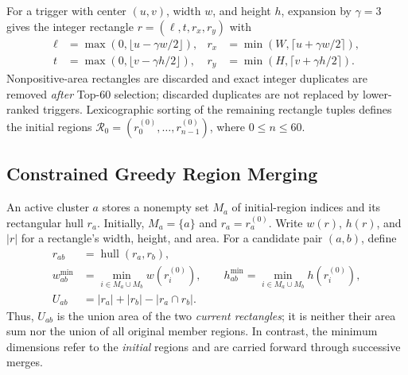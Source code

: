 \documentclass[journal]{IEEEtran}
\begin{document}
For a trigger with center $(u,v)$, width $w$, and height $h$, expansion by $\gamma=3$ gives the integer rectangle $r=(\ell,t,r_x,r_y)$ with
\begin{equation}
\begin{aligned}
\ell&=\max(0,\lfloor u-\gamma w/2\rfloor),&
r_x&=\min(W,\lceil u+\gamma w/2\rceil),\\
t&=\max(0,\lfloor v-\gamma h/2\rfloor),&
r_y&=\min(H,\lceil v+\gamma h/2\rceil).
\end{aligned}
\label{eq:expansion}
\end{equation}
Nonpositive-area rectangles are discarded and exact integer duplicates are removed \emph{after} Top-60 selection; discarded duplicates are not replaced by lower-ranked triggers. Lexicographic sorting of the remaining rectangle tuples defines the initial regions $\mathcal R_0=(r_0^{(0)},\ldots,r_{n-1}^{(0)})$, where $0\leq n\leq60$.

\subsection{Constrained Greedy Region Merging}
An active cluster $a$ stores a nonempty set $M_a$ of initial-region indices and its rectangular hull $r_a$. Initially, $M_a=\{a\}$ and $r_a=r_a^{(0)}$. Write $w(r)$, $h(r)$, and $|r|$ for a rectangle's width, height, and area. For a candidate pair $(a,b)$, define
\begin{equation}
\begin{aligned}
r_{ab}&=\operatorname{hull}(r_a,r_b),\\
w_{ab}^{\min}&=\min_{i\in M_a\cup M_b}w(r_i^{(0)}),\qquad
h_{ab}^{\min}=\min_{i\in M_a\cup M_b}h(r_i^{(0)}),\\
U_{ab}&=|r_a|+|r_b|-|r_a\cap r_b|.
\end{aligned}
\label{eq:merge-state}
\end{equation}
Thus, $U_{ab}$ is the union area of the two \emph{current rectangles}; it is neither their area sum nor the union of all original member regions. In contrast, the minimum dimensions refer to the \emph{initial} regions and are carried forward through successive merges.
\end{document}
